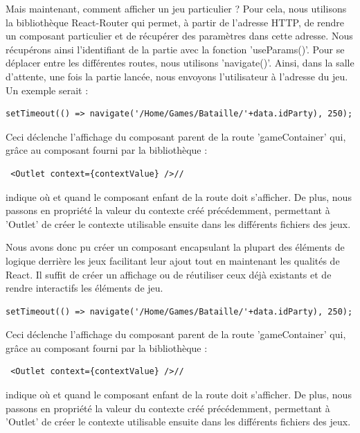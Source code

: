 \documentclass[a4paper]{article}
\begin{document}
Mais maintenant, comment afficher un jeu particulier ? Pour cela, nous utilisons la bibliothèque React-Router qui permet, à partir de l'adresse HTTP, de rendre un composant particulier et de récupérer des paramètres dans cette adresse. Nous récupérons ainsi l'identifiant de la partie avec la fonction 'useParams()'. Pour se déplacer entre les différentes routes, nous utilisons 'navigate()'. Ainsi, dans la salle d'attente, une fois la partie lancée, nous envoyons l'utilisateur à l'adresse du jeu. Un exemple serait :

\begin{verbatim}
setTimeout(() => navigate('/Home/Games/Bataille/'+data.idParty), 250);
\end{verbatim}

Ceci déclenche l'affichage du composant parent de la route 'gameContainer' qui, grâce au composant fourni par la bibliothèque :

\begin{verbatim}
 <Outlet context={contextValue} />//
\end{verbatim}

indique où et quand le composant enfant de la route doit s'afficher. De plus, nous passons en propriété la valeur du contexte créé précédemment, permettant à 'Outlet' de créer le contexte utilisable ensuite dans les différents fichiers des jeux.

Nous avons donc pu créer un composant encapsulant la plupart des éléments de logique derrière les jeux facilitant leur ajout tout en maintenant les qualités de React. Il suffit de créer un affichage ou de réutiliser ceux déjà existants et de rendre interactifs les éléments de jeu.

\begin{verbatim}
setTimeout(() => navigate('/Home/Games/Bataille/'+data.idParty), 250);
\end{verbatim}

Ceci déclenche l'affichage du composant parent de la route 'gameContainer' qui, grâce au composant fourni par la bibliothèque :

\begin{verbatim}
 <Outlet context={contextValue} />//
\end{verbatim}

indique où et quand le composant enfant de la route doit s'afficher. De plus, nous passons en propriété la valeur du contexte créé précédemment, permettant à 'Outlet' de créer le contexte utilisable ensuite dans les différents fichiers des jeux.
\end{document}
